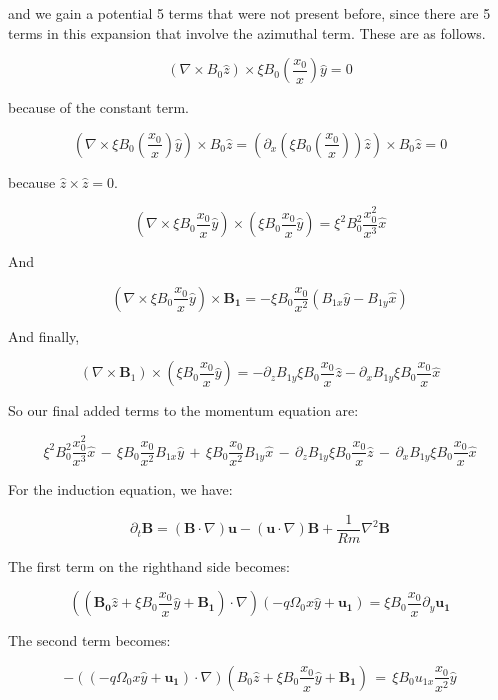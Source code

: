 \documentclass[letterpaper,12pt]{article}
\newcommand{\beq}{\begin{equation}}
\newcommand{\eeq}{\end{equation}}
\newcommand\reym{\mathrel{Rm}}
\begin{document}
and we gain a potential 5 terms that were not present before, since there are 5 terms in this expansion that involve the azimuthal term. These are as follows.

\beq
\left(\nabla \times B_0 \hat{z} \right) \times \xi B_0 \left(\frac{x_0}{x}\right)\hat{y} = 0
\eeq

because of the constant term.

\beq
\left(\nabla \times \xi B_0 \left(\frac{x_0}{x}\right) \hat{y} \right) \times B_0 \hat{z} = \left(\partial_x \left(\xi B_0 \left(\frac{x_0}{x}\right)\right)\hat{z}\right) \times B_0 \hat{z} = 0
\eeq

because $\hat{z} \times \hat{z} = 0$.

\beq
\left(\nabla \times \xi B_0 \frac{x_0}{x} \hat{y} \right) \times \left( \xi B_0 \frac{x_0}{x}\hat{y}\right) = \xi^2 B_0^2 \frac{x_0^2}{x^3} \hat{x}
\eeq

And

\beq
\left(\nabla \times \xi B_0 \frac{x_0}{x} \hat{y}\right) \times \mathbf{B_1} = -\xi B_0 \frac{x_0}{x^2} \left(B_{1x} \hat{y} - B_{1y} \hat{x}\right)
\eeq

And finally,

\beq
\left(\nabla \times \mathbf{B}_1 \right) \times \left(\xi B_0 \frac{x_0}{x} \hat{y}\right) = - \partial_z B_{1y} \xi B_0 \frac{x_0}{x} \hat{z} - \partial_x B_{1y} \xi B_0 \frac{x_0}{x} \hat{x}
\eeq

So our final added terms to the momentum equation are:

\beq
\label{momeq_added}
\xi^2 B_0^2 \frac{x_0^2}{x^3} \hat{x} \, - \,  \xi B_0 \frac{x_0}{x^2} B_{1x} \hat{y} \, + \, \xi B_0 \frac{x_0}{x^2} B_{1y} \hat{x} \, - \, \partial_z B_{1y} \xi B_0 \frac{x_0}{x} \hat{z} \, - \, \partial_x B_{1y} \xi B_0 \frac{x_0}{x} \hat{x}
\eeq

For the induction equation, we have:

\beq
\partial_t \mathbf{B} = \left(\mathbf{B} \cdot \nabla \right) \mathbf{u} - \left(\mathbf{u} \cdot \nabla \right) \mathbf{B} + \frac{1}{\reym} \nabla^2 \mathbf{B}
\eeq

The first term on the righthand side becomes:

\beq
\left( \left( \mathbf{B_0} \hat{z} + \xi B_0 \frac{x_0}{x} \hat{y} + \mathbf{B_1} \right) \cdot \nabla \right) \left(-q \Omega_0 x \hat{y} + \mathbf{u_1}\right) = \xi B_0 \frac{x_0}{x} \partial_y \mathbf{u_1}
\eeq

The second term becomes:

\beq
-\left( \left( -q \Omega_0 x \hat{y} + \mathbf{u_1}\right) \cdot \nabla\right) \left( B_0 \hat{z} + \xi B_0 \frac{x_0}{x} \hat{y} + \mathbf{B_1}\right)   \, = \, \xi B_0 u_{1x} \frac{x_0}{x^2} \hat{y}
\eeq
\end{document}
